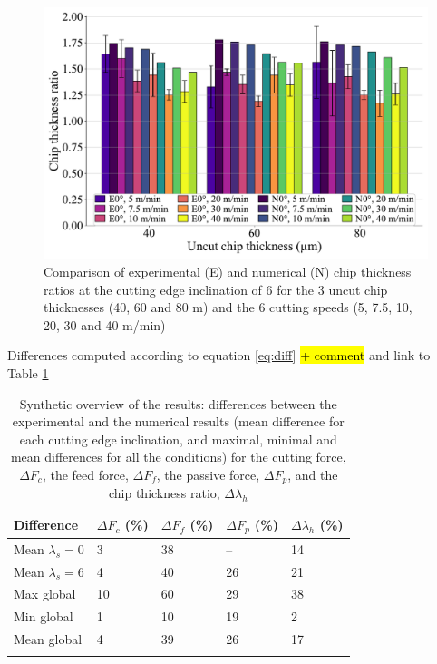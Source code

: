 \documentclass[preprint,12pt,times]{elsarticle}
\begin{document}
\begin{figure}[!h]
\centering
\includegraphics[width = 140 mm]{Figures/h6}
\caption{Comparison of experimental (E) and numerical (N) chip thickness ratios at the cutting edge inclination of 6\textdegree{} for the 3 uncut chip thicknesses (40, 60 and 80 \textmu{}m) and the 6 cutting speeds (5, 7.5, 10, 20, 30 and 40 m/min)}
\label{h6}
\end{figure}

Differences computed according to equation \ref{eq:diff} \hl{+ comment} and link to Table \ref{tab:Synth}

%
\begin{table}[!h]
\begin{center}
\caption{\label{tab:Synth} Synthetic overview of the results: differences between the experimental and the numerical results (mean difference for each cutting edge inclination, and maximal, minimal and mean differences for all the conditions) for the cutting force, $\Delta F_c$, the feed force, $\Delta F_f$, the passive force, $\Delta F_p$, and the chip thickness ratio, $\Delta \lambda_h$}
\begin{tabular}{lllll}
\hline\noalign{\smallskip}
Difference & $\Delta F_c$ (\%) & $\Delta F_f$ (\%) & $\Delta F_p$ (\%) & $\Delta \lambda_h$ (\%)\\
\hline\noalign{\smallskip}
Mean $\lambda_s = 0$\textdegree{} & 3 & 38 & -- & 14\\
Mean $\lambda_s = 6$\textdegree{} & 4 & 40 & 26 & 21\\
Max global & 10 & 60 & 29 & 38\\
Min global & 1 & 10 & 19 & 2\\
Mean global & 4 & 39 & 26 & 17\\
\noalign{\smallskip}\hline\noalign{\smallskip}
\end{tabular}
\end{center}
\end{table}
%
\end{document}
